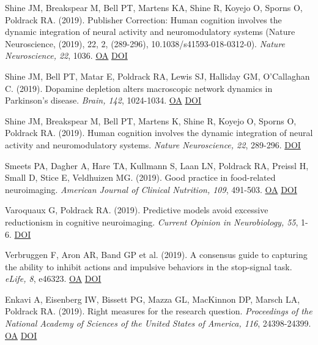 \documentclass[10pt, letterpaper]{article}
\begin{document}
Shine JM, Breakspear M, Bell PT, Martens KA, Shine R, Koyejo O, Sporns O, Poldrack RA.  (2019). Publisher Correction: Human cognition involves the dynamic integration of neural activity and neuromodulatory systems (Nature Neuroscience, (2019), 22, 2, (289-296), 10.1038/s41593-018-0312-0). \textit{Nature Neuroscience, 22}, 1036. \href{https://doi.org/10.1038/s41593-019-0347-x}{OA} \href{https://doi.org/10.1038/s41593-019-0347-x}{DOI} \vspace{2mm}

Shine JM, Bell PT, Matar E, Poldrack RA, Lewis SJ, Halliday GM, O'Callaghan C.  (2019). Dopamine depletion alters macroscopic network dynamics in Parkinson's disease. \textit{Brain, 142}, 1024-1034. \href{https://www.ncbi.nlm.nih.gov/pmc/articles/PMC6904322}{OA} \href{https://doi.org/10.1093/brain/awz034}{DOI} \vspace{2mm}

Shine JM, Breakspear M, Bell PT, Martens K, Shine R, Koyejo O, Sporns O, Poldrack RA.  (2019). Human cognition involves the dynamic integration of neural activity and neuromodulatory systems. \textit{Nature Neuroscience, 22}, 289-296. \href{https://doi.org/10.1038/s41593-018-0312-0}{DOI} \vspace{2mm}

Smeets PA, Dagher A, Hare TA, Kullmann S, Laan LN, Poldrack RA, Preissl H, Small D, Stice E, Veldhuizen MG.  (2019). Good practice in food-related neuroimaging. \textit{American Journal of Clinical Nutrition, 109}, 491-503. \href{https://www.ncbi.nlm.nih.gov/pmc/articles/PMC7945961}{OA} \href{https://doi.org/10.1093/ajcn/nqy344}{DOI} \vspace{2mm}

Varoquaux G, Poldrack RA.  (2019). Predictive models avoid excessive reductionism in cognitive neuroimaging. \textit{Current Opinion in Neurobiology, 55}, 1-6. \href{https://doi.org/10.1016/j.conb.2018.11.002}{DOI} \vspace{2mm}

Verbruggen F, Aron AR, Band GP et al. (2019). A consensus guide to capturing the ability to inhibit actions and impulsive behaviors in the stop-signal task. \textit{eLife, 8}, e46323. \href{https://www.ncbi.nlm.nih.gov/pmc/articles/PMC6533084}{OA} \href{https://doi.org/10.7554/elife.46323}{DOI} \vspace{2mm}

Enkavi A, Eisenberg IW, Bissett PG, Mazza GL, MacKinnon DP, Marsch LA, Poldrack RA.  (2019). Right measures for the research question. \textit{Proceedings of the National Academy of Sciences of the United States of America, 116}, 24398-24399. \href{https://www.ncbi.nlm.nih.gov/pmc/articles/PMC6900533}{OA} \href{https://doi.org/10.1073/pnas.1917123116}{DOI} \vspace{2mm}
\end{document}
